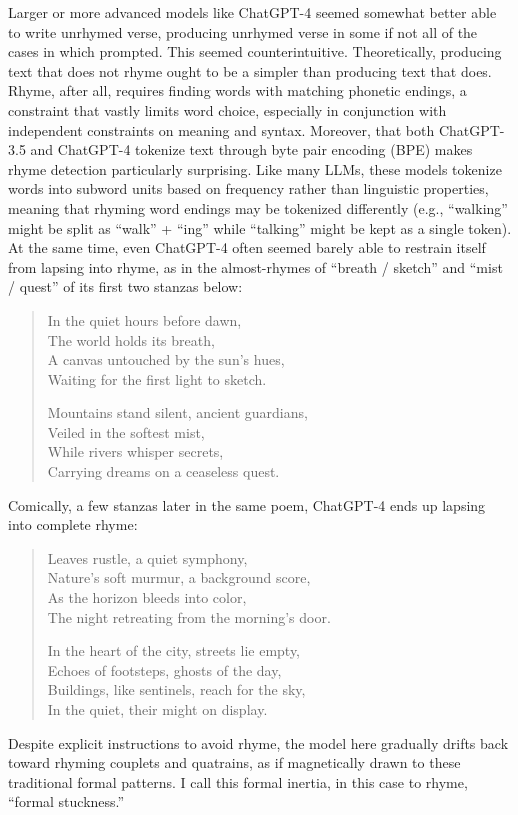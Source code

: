 \documentclass{simple-humanities}         %
\begin{document}
Larger or more advanced models like ChatGPT-4 seemed somewhat better able to write unrhymed verse, producing unrhymed verse in some if not all of the cases in which prompted.
This seemed counterintuitive.
Theoretically, producing text that does not rhyme ought to be a simpler than producing text that does.
Rhyme, after all, requires finding words with matching phonetic endings, a constraint that vastly limits word choice, especially in conjunction with independent constraints on meaning and syntax.
Moreover, that both ChatGPT-3.5 and ChatGPT-4 tokenize text through byte pair encoding (BPE) makes rhyme detection particularly surprising.
Like many LLMs, these models tokenize words into subword units based on frequency rather than linguistic properties, meaning that rhyming word endings may be tokenized differently (e.g., ``walking'' might be split as ``walk'' + ``ing'' while ``talking'' might be kept as a single token).
At the same time, even ChatGPT-4 often seemed barely able to restrain itself from lapsing into rhyme, as in the almost-rhymes of ``breath / sketch'' and ``mist / quest'' of its first two stanzas below:

\begin{quote}
In the quiet hours before dawn,\\
The world holds its breath,\\
A canvas untouched by the sun's hues,\\
Waiting for the first light to sketch.

Mountains stand silent, ancient guardians,\\
Veiled in the softest mist,\\
While rivers whisper secrets,\\
Carrying dreams on a ceaseless quest.
\end{quote}
Comically, a few stanzas later in the same poem, ChatGPT-4 ends up lapsing into complete rhyme:

\begin{quote}
Leaves rustle, a quiet symphony,\\
Nature's soft murmur, a background score,\\
As the horizon bleeds into color,\\
The night retreating from the morning's door.

In the heart of the city, streets lie empty,\\
Echoes of footsteps, ghosts of the day,\\
Buildings, like sentinels, reach for the sky,\\
In the quiet, their might on display.
\end{quote}
Despite explicit instructions to avoid rhyme, the model here gradually drifts back toward rhyming couplets and quatrains, as if magnetically drawn to these traditional formal patterns.
I call this formal inertia, in this case to rhyme, ``formal stuckness.''
\end{document}
